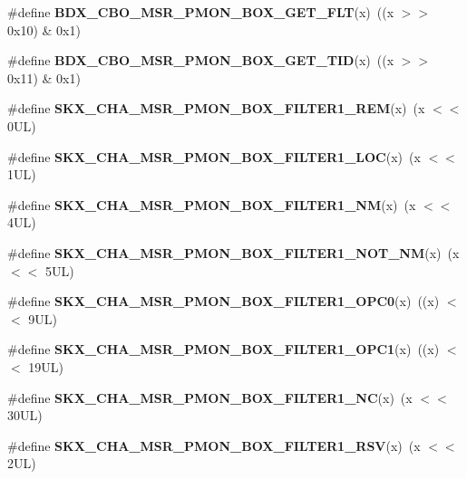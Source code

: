 \begin{DoxyCompactItemize}
\item 
\mbox{\label{types_8h_ae92dd6e630ecb40c81f9846490134c89}} 
\#define {\bfseries B\+D\+X\+\_\+\+C\+B\+O\+\_\+\+M\+S\+R\+\_\+\+P\+M\+O\+N\+\_\+\+B\+O\+X\+\_\+\+G\+E\+T\+\_\+\+F\+LT}(x)~((x $>$$>$ 0x10) \& 0x1)
\item 
\mbox{\label{types_8h_a45f282805f3690357d8bb1faea98ab8e}} 
\#define {\bfseries B\+D\+X\+\_\+\+C\+B\+O\+\_\+\+M\+S\+R\+\_\+\+P\+M\+O\+N\+\_\+\+B\+O\+X\+\_\+\+G\+E\+T\+\_\+\+T\+ID}(x)~((x $>$$>$ 0x11) \& 0x1)
\item 
\mbox{\label{types_8h_a55d0265a1ad55c2aca189e0354eae4d3}} 
\#define {\bfseries S\+K\+X\+\_\+\+C\+H\+A\+\_\+\+M\+S\+R\+\_\+\+P\+M\+O\+N\+\_\+\+B\+O\+X\+\_\+\+F\+I\+L\+T\+E\+R1\+\_\+\+R\+EM}(x)~(x $<$$<$ 0\+U\+L)
\item 
\mbox{\label{types_8h_a61aab37add1677a1f5cc4cd8d75c5a12}} 
\#define {\bfseries S\+K\+X\+\_\+\+C\+H\+A\+\_\+\+M\+S\+R\+\_\+\+P\+M\+O\+N\+\_\+\+B\+O\+X\+\_\+\+F\+I\+L\+T\+E\+R1\+\_\+\+L\+OC}(x)~(x $<$$<$ 1\+U\+L)
\item 
\mbox{\label{types_8h_a68f3752797bd9da52add09b03347be76}} 
\#define {\bfseries S\+K\+X\+\_\+\+C\+H\+A\+\_\+\+M\+S\+R\+\_\+\+P\+M\+O\+N\+\_\+\+B\+O\+X\+\_\+\+F\+I\+L\+T\+E\+R1\+\_\+\+NM}(x)~(x $<$$<$ 4\+U\+L)
\item 
\mbox{\label{types_8h_a45bc5d7b9e7a78a97499d412a7147e85}} 
\#define {\bfseries S\+K\+X\+\_\+\+C\+H\+A\+\_\+\+M\+S\+R\+\_\+\+P\+M\+O\+N\+\_\+\+B\+O\+X\+\_\+\+F\+I\+L\+T\+E\+R1\+\_\+\+N\+O\+T\+\_\+\+NM}(x)~(x $<$$<$ 5\+U\+L)
\item 
\mbox{\label{types_8h_a55ed05e356c61a26c6b91d601f8528db}} 
\#define {\bfseries S\+K\+X\+\_\+\+C\+H\+A\+\_\+\+M\+S\+R\+\_\+\+P\+M\+O\+N\+\_\+\+B\+O\+X\+\_\+\+F\+I\+L\+T\+E\+R1\+\_\+\+O\+P\+C0}(x)~((x) $<$$<$ 9\+U\+L)
\item 
\mbox{\label{types_8h_a168ec729d88d6577dff04058a82732f1}} 
\#define {\bfseries S\+K\+X\+\_\+\+C\+H\+A\+\_\+\+M\+S\+R\+\_\+\+P\+M\+O\+N\+\_\+\+B\+O\+X\+\_\+\+F\+I\+L\+T\+E\+R1\+\_\+\+O\+P\+C1}(x)~((x) $<$$<$ 19\+U\+L)
\item 
\mbox{\label{types_8h_a6c56c4610d15e5e4c4596c66473f8782}} 
\#define {\bfseries S\+K\+X\+\_\+\+C\+H\+A\+\_\+\+M\+S\+R\+\_\+\+P\+M\+O\+N\+\_\+\+B\+O\+X\+\_\+\+F\+I\+L\+T\+E\+R1\+\_\+\+NC}(x)~(x $<$$<$ 30\+U\+L)
\item 
\mbox{\label{types_8h_aa0e49083387946f6720c9a79e584cb2d}} 
\#define {\bfseries S\+K\+X\+\_\+\+C\+H\+A\+\_\+\+M\+S\+R\+\_\+\+P\+M\+O\+N\+\_\+\+B\+O\+X\+\_\+\+F\+I\+L\+T\+E\+R1\+\_\+\+R\+SV}(x)~(x $<$$<$ 2\+U\+L)
\item 

\end{DoxyCompactItemize}
